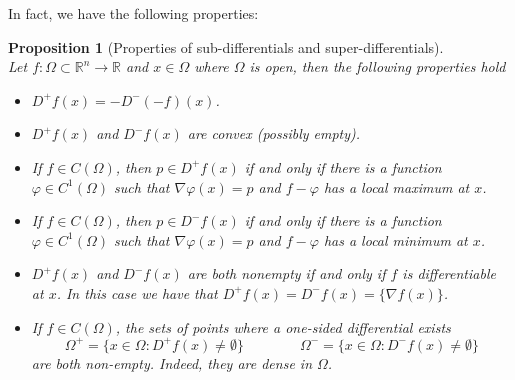 \documentclass[12pt, oneside]{amsart}  	%
\newtheorem{proposition}{Proposition}
\begin{document}
In fact, we have the following properties:
\begin{proposition}[Properties of sub-differentials and super-differentials]\quad \\
Let $f:\Omega\subset \mathbb{R}^n\longrightarrow \mathbb{R}$ and $x\in \Omega$ where $\Omega$ is open, then the following properties hold
\begin{itemize}
\item[(a)] $D^+f(x) = -D^-(-f)(x)$.
\item[(b)] $D^+f(x)$ and $D^-f(x)$ are convex (possibly empty).
\item[(c)] If $f\in C(\Omega)$, then $p\in D^+f(x)$ if and only if there is a function $\varphi \in C^1(\Omega)$ such that $\nabla \varphi (x) = p$ and $f - \varphi$ has a local maximum at $x$.
\item[(d)] If $f\in C(\Omega)$, then $p\in D^-f(x)$ if and only if there is a function $\varphi \in C^1(\Omega)$ such that $\nabla \varphi (x) = p$ and $f - \varphi$ has a local minimum at $x$.
\item[(e)] $D^+f(x)$ and $D^-f(x)$ are both nonempty if and only if $f$ is differentiable at $x$. In this case we have that $D^+f(x) = D^-f(x) = \{\nabla f(x) \}$.
\item[(f)] If $f\in C(\Omega)$, the sets of points where a one-sided differential exists
\begin{equation*}
\Omega^+ = \{x\in \Omega:D^+f(x)\neq \emptyset \} \qquad\qquad\Omega^- = \{x\in \Omega:D^-f(x)\neq \emptyset \}
\end{equation*}
are both non-empty. Indeed, they are dense in $\Omega$.
\end{itemize}
\end{proposition}
\end{document}
